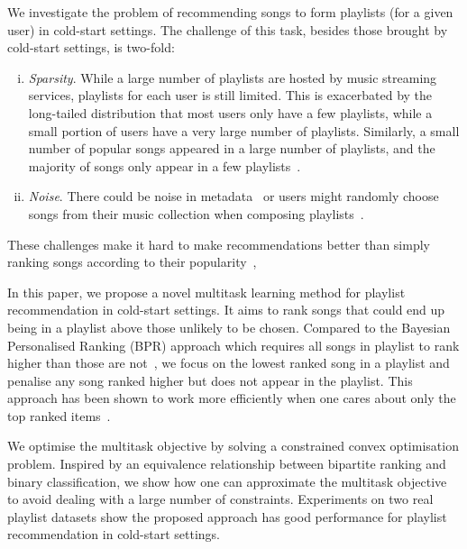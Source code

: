 We investigate the problem of recommending songs to form playlists (for a given user) in cold-start settings.
%
The challenge of this task, besides those brought by cold-start settings, is two-fold:
\begin{enumerate}[(i)]
	\item \emph{Sparsity}. While a large number of playlists are hosted by music streaming services,
playlists for each user is still limited. This is exacerbated by the long-tailed distribution that
most users only have a few playlists, while a small portion of users have a very large number of playlists.
Similarly, a small number of popular songs appeared in a large number of playlists, and the majority of songs
only appear in a few playlists~\cite{bonnin2013evaluating}.
	\item \emph{Noise}. There could be noise in metadata~\cite{bonnin2015automated} or users might randomly choose songs 
from their music collection when composing playlists~\cite{mcfee2012hypergraph}.
\end{enumerate}
These challenges make it hard to make recommendations better than simply ranking songs according to their 
popularity~\cite{mcfee2012million,bonnin2013evaluating,bonnin2015automated},


In this paper, we propose a novel multitask learning method for playlist recommendation in cold-start settings.
It aims to rank songs that could end up being in a playlist %
above those unlikely to be chosen.
Compared to the Bayesian Personalised Ranking (BPR) approach which requires all
songs in playlist to rank higher than those are not~\cite{rendle2009bpr,mcfee2012million}, 
we focus on the lowest ranked song in a playlist and penalise any song ranked higher but does not appear in the playlist.
This approach has been shown to work more efficiently when one cares about only the top ranked items~\cite{li2014top}.

We optimise the multitask objective by solving 
a constrained convex optimisation problem.
Inspired by an equivalence relationship between bipartite ranking and binary classification,
we show how one can approximate the multitask objective to avoid dealing with a large number of constraints.
Experiments on two real playlist datasets show the proposed approach 
has good performance for playlist recommendation in cold-start settings.

